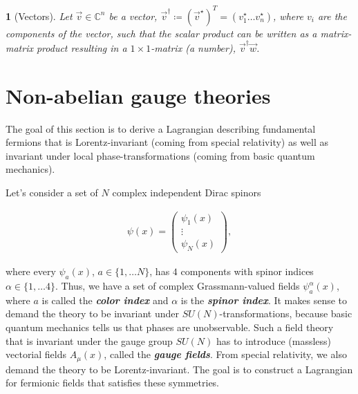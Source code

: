 \documentclass{article}
\theoremstyle{plain} %
\theoremstyle{convention} %
\newtheorem*{convention}{} %
\theoremstyle{remark} %
\def\df#1{\textbf{\textit{#1}}}
\numberwithin{equation}{section}
\begin{document}
\begin{convention}[Vectors]
  Let $\vec{v} \in \mathbb{C}^n$ be a vector, $\vec{v}^{\dagger} \coloneqq (\vec{v}^{\star})^T = (v^{\star}_1 \dots v^{\star}_n)$, where $v_i$ are the components of the vector, such that the scalar product can be written as a matrix-matrix product resulting in a $1 \times 1$-matrix (a number), $\vec{v}^{\dagger} \vec{w}$.
\end{convention}

\section{Non-abelian gauge theories}

\label{sec:gauge_theories}

The goal of this section is to derive a Lagrangian describing fundamental fermions that is Lorentz-invariant (coming from special relativity) as well as invariant under local phase-transformations (coming from basic quantum mechanics).

Let's consider a set of $N$ complex independent Dirac spinors

\begin{align*}
    \psi(x) = \begin{pmatrix}
    \psi_1(x) \\
    \vdots \\
    \psi_N(x) 
    \end{pmatrix},
\end{align*}

where every $\psi_a(x)$, $a \in \{1, \dots N\}$, has $4$ components with spinor indices $\alpha \in \{1, \dots 4\}$. Thus, we have a set of complex Grassmann-valued fields $\psi_{a}^{\alpha}(x)$, where $a$ is called the \df{color index} and $\alpha$ is the \df{spinor index}. It makes sense to demand the theory to be invariant under $SU(N)$-transformations, because basic quantum mechanics tells us that phases are unobservable. Such a field theory that is invariant under the gauge group $SU(N)$ has to introduce (massless) vectorial fields $A_{\mu}(x)$, called the \df{gauge fields}. From special relativity, we also demand the theory to be Lorentz-invariant. The goal is to construct a Lagrangian for fermionic fields that satisfies these symmetries.
\end{document}
